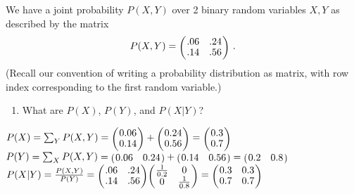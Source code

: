 

\renewcommand{\course}{Artificial Intelligence}
\renewcommand{\coursepicture}{course_ai}
\renewcommand{\coursedate}{Summer 2023}

\renewcommand{\exnum}{Exercise 1}

\exercises
\exercisestitle



We have a joint probability $P(X,Y)$ over 2 binary random variables
$X,Y$ as described by the matrix
$$
P(X,Y)
= \mat{cc}{ .06 & .24 \\ .14 & .56} ~.
$$
(Recall our convention of writing a probability distribution as matrix, with row index corresponding to the first random variable.)

\begin{enumerate}
\item What are $P(X)$, $P(Y)$, and $P(X|Y)$?
\end{enumerate}

\begin{solution}
$P(X) = \sum_Y P(X, Y) = \mat{c}{ 0.06 \\ 0.14} + \mat{c}{ 0.24 \\ 0.56} = \mat{c}{ 0.3 \\ 0.7}$ \\
$P(Y) = \sum_X P(X, Y)  = \mat{cc}{ 0.06 & 0.24} + \mat{cc}{ 0.14 & 0.56} =  \mat{cc}{ 0.2 & 0.8}$ \\
$P(X|Y) = \frac{P(X,Y)}{P(Y)} = \mat{cc}{ .06 & .24 \\ .14 & .56} \mat{cc}{ \frac{1}{0.2} & 0 \\ 0 & \frac{1}{0.8}} = \mat{cc}{ 0.3 & 0.3 \\ 0.7 & 0.7}  $

\end{solution}


